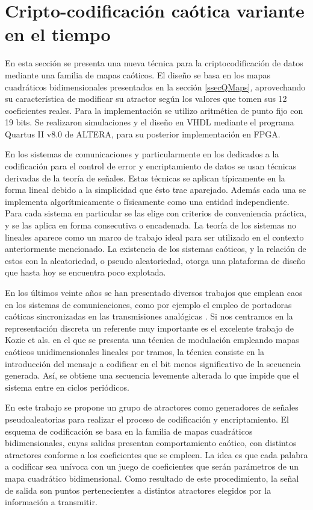 \section{Cripto-codificación caótica variante en el tiempo}
\label{sec:CodCaot}

En esta sección se presenta una nueva técnica para la criptocodificación de datos mediante una familia de mapas caóticos.
El diseño se basa en los mapas cuadráticos bidimensionales presentados en la sección \ref{ssecQMaps}, aprovechando su característica de modificar su atractor según los valores que tomen sus 12 coeficientes reales.
Para la implementación se utilizo aritmética de punto fijo con 19 bits.
Se realizaron simulaciones y el diseño en VHDL mediante el programa Quartus II v8.0 de ALTERA, para su posterior implementación en FPGA.

En los sistemas de comunicaciones y particularmente en los dedicados a la codificación para el control de error y encriptamiento de datos se usan técnicas derivadas de la teoría de señales.
Estas técnicas se aplican típicamente en la forma lineal debido a la simplicidad que ésto trae aparejado.
Además cada una se implementa algorítmicamente o físicamente como una entidad independiente.
Para cada sistema en particular se las elige con criterios de conveniencia práctica, y se las aplica en forma consecutiva o encadenada.
La teoría de los sistemas no lineales \cite{Strogatz1994,Lasota1994} aparece como un marco de trabajo ideal para ser utilizado en el contexto anteriormente mencionado.
La existencia de los sistemas caóticos, y la relación de estos con la aleatoriedad, o pseudo aleatoriedad, otorga una plataforma de diseño que hasta hoy se encuentra poco explotada.

En los últimos veinte años se han presentado diversos trabajos que emplean caos en los sistemas de comunicaciones, como por ejemplo el empleo de portadoras caóticas sincronizadas en las transmisiones analógicas \cite{Kocarev1995,Hidalgo2001}.
Si nos centramos en la representación discreta un referente muy importante es el excelente trabajo de Kozic et als. \cite{Kozic2006A,Kozic2006B} en el que se presenta una técnica de modulación empleando mapas caóticos unidimensionales lineales por tramos, la técnica consiste en la introducción del mensaje a codificar en el bit menos significativo de la secuencia generada.
Así, se obtiene una secuencia levemente alterada lo que impide que el sistema entre en ciclos periódicos.

En este trabajo se propone un grupo de atractores como generadores de señales pseudoaleatorias para realizar el proceso de codificación y encriptamiento.
El esquema de codificación se basa en la familia de mapas cuadráticos bidimensionales, cuyas salidas presentan comportamiento caótico, con distintos atractores conforme a los coeficientes que se empleen.
La idea es que cada palabra a codificar sea unívoca con un juego de coeficientes que serán parámetros de un mapa cuadrático bidimensional.
Como resultado de este procedimiento, la señal de salida son puntos pertenecientes a distintos atractores elegidos por la información a transmitir.

